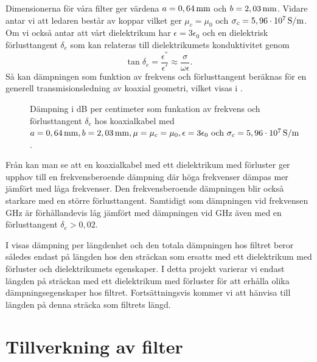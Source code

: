 \documentclass[main.tex]{subfiles}
\begin{document}
Dimensionerna för våra filter ger värdena $a=\unit[0,64]{mm}$ och $b=\unit[2,03]{mm}$. Vidare antar vi att ledaren består av koppar vilket ger $\mu_c=\mu_0$ och $\sigma_c=\unit[5,96\cdot 10^7]{S/m}$. Om vi också antar att vårt dielektrikum har $\epsilon=3\epsilon_0$ och en dielektrisk förlusttangent $\delta_e$ som kan relateras \cite{cheng} till dielektrikumets konduktivitet genom
\begin{equation*}
    \tan\delta_e=\frac{\epsilon^{''}}{\epsilon'}\approx\frac{\sigma}{\omega\epsilon}.
\end{equation*}
Så kan dämpningen som funktion av frekvens och förlusttangent beräknas för en generell transmisionsledning av koaxial geometri, vilket visas i .

\begin{figure}[H]
    
        \centering
        \setlength{}
        \setlength\figureheight{12em}
        
  \caption{Dämpning i \unit{dB} per centimeter som funkation av frekvens och förlusttangent $\delta_e$ hos koaxialkabel med $a=\unit[0,64]{mm}, b=\unit[2,03]{mm}, \mu=\mu_c=\mu_0, \epsilon=3\epsilon_0 \text{ och } \sigma_c=\unit[5,96\cdot10^7]{S/m}$.}
  \label{fig:attn_ex}
\end{figure}

Från  kan man se att en koaxialkabel med ett dielektrikum med förluster ger upphov till en frekvensberoende dämpning där höga frekvenser dämpas mer jämfört med låga frekvenser. Den frekvensberoende dämpningen blir också starkare med en större förlusttangent. Samtidigt som dämpningen vid frekvensen \unit[0-8]{GHz} är förhållandevis låg jämfört med dämpningen vid \unit[100]{GHz} även med en förlusttangent $\delta_e>0,02$.

I  visas dämpning per längdenhet och den totala dämpningen hos filtret beror således endast på längden hos den sträckan som ersatts med ett dielektrikum med förluster och dielektrikumets egenskaper. I detta projekt varierar vi endast längden på sträckan med ett dielektrikum med förluster för att erhålla olika dämpningsegenskaper hos filtret. Fortsättningsvis kommer vi att hänvisa till längden på denna sträcka som filtrets längd. 





\section{Tillverkning av filter}
\end{document}
